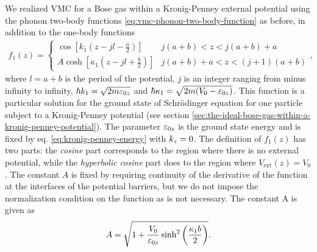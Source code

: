 We realized VMC for a Bose gas within a Kronig-Penney external potential using
the phonon two-body functions \eqref{eq:vmc-phonon-two-body-function} as before,
in addition to the one-body functions
%
\begin{align}
  f_1(z) = \begin{cases}
    \cos \left[k_1 \left(z - jl - \frac{a}{2} \right)\right]         & j(a + b) < z < j(a+b) + a       \\
    A \cosh\left[\kappa_1 \left(z - jl + \frac{b}{2} \right) \right] & j(a + b) + a < z < (j+1)(a + b)
  \end{cases},
\end{align}
%
where $l = a + b$ is the period of the potential, $j$ is an integer ranging from
minus infinity to infinity, $\hbar k_1 = \sqrt{2m\ez[0]}$ and $\hbar \kappa_1 =
  \sqrt{2m(V_0 - \ez[0])}$. This function is a particular solution for the ground
state of Schrödinger equation for one particle subject to a Kronig-Penney
potential (see section
\ref{sec:the-ideal-bose-gas-within-a-kronig-penney-potential}). The parameter
$\ez[0]$ is the ground state energy and is fixed by eq.
\eqref{eq:kronig-penney-energy} with $\kz = 0$. The definition of $f_1(z)$ has
two parts: the \textit{cosine} part corresponds to the region where there is no
external potential, while the \textit{hyperbolic cosine} part does to the region
where $V_\mathrm{ext}(z) = V_0$. The constant $A$ is fixed by requiring
continuity of the derivative of the function at the interfaces of the potential
barriers, but we do not impose the normalization condition on the function as is
not necessary. The constant A is given as
%
\begin{equation}
  A = \sqrt{1 + \frac{V_0}{\ez[0]} \sinh^2\left( \frac{\kappa_1 b}{2} \right)}.
\end{equation}

